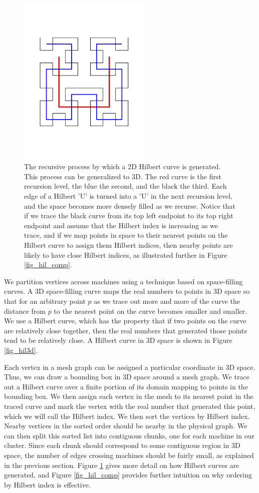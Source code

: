 \documentclass[journal]{IEEEtran}
\begin{document}
\begin{figure}[!t]
\centering
\includegraphics[trim=0cm 5cm 0cm 5cm, width=2.5in]{2d_hilbert}
\caption{The recursive process by which a 2D Hilbert curve is generated. This process can be generalized to 3D. The red curve is the first recursion level, the blue the second, and the black the third. Each edge of a Hilbert 'U' is turned into a 'U' in the next recursion level, and the space becomes more densely filled as we recurse. Notice that if we trace the black curve from its top left endpoint to its top right endpoint and assume that the Hilbert index is increasing as we trace, and if we map points in space to their nearest points on the Hilbert curve to assign them Hilbert indices, then nearby points are likely to have close Hilbert indices, as illustrated further in Figure \ref{fig_hil_comp}.}
\label{fig_hil2d}
\end{figure}

We partition vertices across machines using a technique based on space-filling curves. A 3D space-filling curve maps the real numbers to points in 3D space so that for an arbitrary point $p$ as we trace out more and more of the curve the distance from $p$ to the nearest point on the curve becomes smaller and smaller. We use a Hilbert curve, which has the property that if two points on the curve are relatively close together, then the real numbers that generated those points tend to be relatively close. A Hilbert curve in 3D space is shown in Figure \ref{fig_hil3d}.

Each vertex in a mesh graph can be assigned a particular coordinate in 3D space. Thus, we can draw a bounding box in 3D space around a mesh graph. We trace out a Hilbert curve over a finite portion of its domain mapping to points in the bounding box. We then assign each vertex in the mesh to its nearest point in the traced curve and mark the vertex with the real number that generated this point, which we will call the Hilbert index. We then sort the vertices by Hilbert index. Nearby vertices in the sorted order should be nearby in the physical graph. We can then split this sorted list into contiguous chunks, one for each machine in our cluster. Since each chunk should correspond to some contiguous region in 3D space, the number of edges crossing machines should be fairly small, as explained in the previous section. Figure \ref{fig_hil2d} gives more detail on how Hilbert curves are generated, and Figure \ref{fig_hil_comp} provides further intuition on why ordering by Hilbert index is effective.
\end{document}

